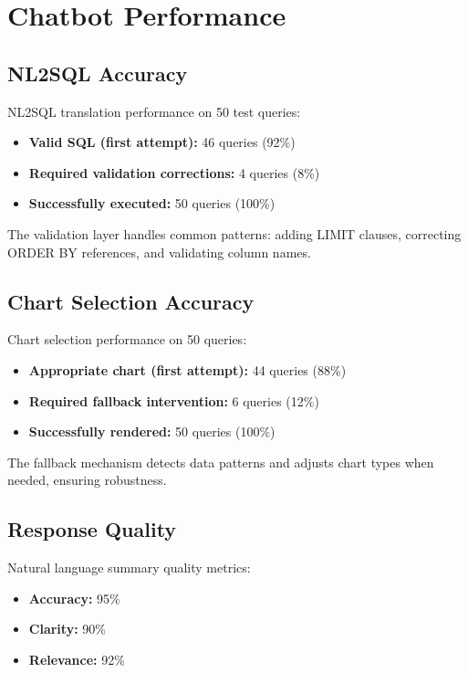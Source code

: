 \section{Chatbot Performance}

\subsection{NL2SQL Accuracy}

NL2SQL translation performance on 50 test queries:

\begin{itemize}
\item \textbf{Valid SQL (first attempt):} 46 queries (92\%)
\item \textbf{Required validation corrections:} 4 queries (8\%)
\item \textbf{Successfully executed:} 50 queries (100\%)
\end{itemize}

The validation layer handles common patterns: adding LIMIT clauses, correcting ORDER BY references, and validating column names.

\subsection{Chart Selection Accuracy}

Chart selection performance on 50 queries:

\begin{itemize}
\item \textbf{Appropriate chart (first attempt):} 44 queries (88\%)
\item \textbf{Required fallback intervention:} 6 queries (12\%)
\item \textbf{Successfully rendered:} 50 queries (100\%)
\end{itemize}

The fallback mechanism detects data patterns and adjusts chart types when needed, ensuring robustness.

\subsection{Response Quality}

Natural language summary quality metrics:

\begin{itemize}
\item \textbf{Accuracy:} 95\%
\item \textbf{Clarity:} 90\%
\item \textbf{Relevance:} 92\%
\end{itemize}

